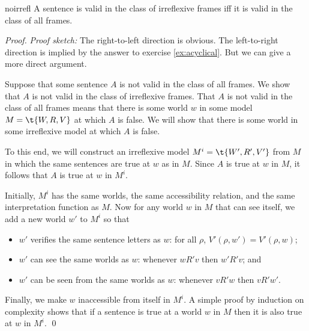 \begin{observation}{noirrefl}
  A sentence is valid in the class of irreflexive frames iff it is valid in the
  class of all frames.
\end{observation}
%
\begin{proof}
  \emph{Proof sketch:} The right-to-left direction is obvious. The left-to-right direction is implied by the answer to exercise \ref{ex:acyclical}.
  But we can give a more direct argument.

  Suppose that some sentence $A$ is not valid in the class of all frames. We
  show that $A$ is not valid in the class of irreflexive frames. That $A$ is not
  valid in the class of all frames means that there is some world $w$ in some
  model $M = \t{W,R,V}$ at which $A$ is false. We will show that there is some
  world in some irreflexive model at which $A$ is false.

  To this end, we will construct an irreflexive model $M^i = \t{W',R',V'}$ from
  $M$ in which the same sentences are true at $w$ as in $M$. Since $A$ is true
  at $w$ in $M$, it follows that $A$ is true at $w$ in $M^i$.

  Initially, $M^i$ has the same worlds, the same accessibility relation, and the
  same interpretation function as $M$. Now for any world $w$ in $M$ that can see
  itself, we add a new world $w'$ to $M^i$ so that
  \begin{itemize}[leftmargin=10mm]
    \itemsep-1mm
  \item $w'$ verifies the same sentence letters as $w$: for all $\rho$, $V'(\rho,w') = V'(\rho, w)$;
  \item $w'$ can see the same worlds as $w$: whenever $wR'v$ then $w'R'v$; and
  \item $w'$ can be seen from the same worlds as $w$: whenever $vR'w$ then $vR'w'$.
  \end{itemize}
  Finally, we make $w$ inaccessible from itself in $M^i$. A simple proof
  by induction on complexity shows that if a sentence is true at a
  world $w$ in $M$ then it is also true at $w$ in $M^i$.
  \qed

\end{proof}

